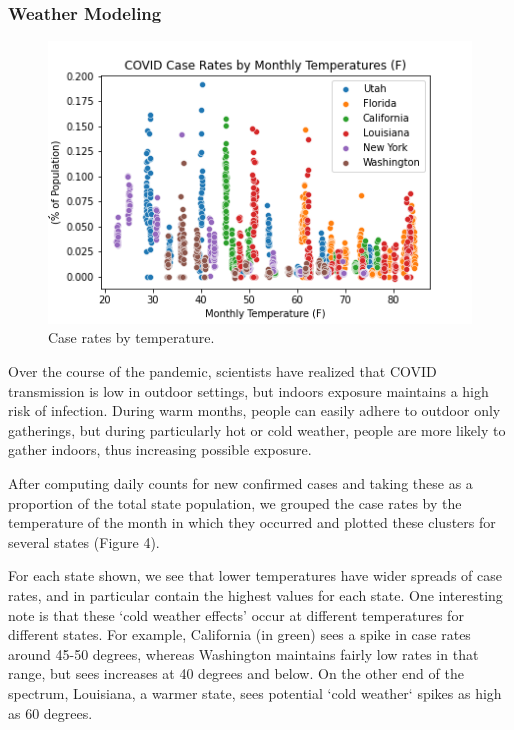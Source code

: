 \documentclass[11pt]{article}
\begin{document}
% 

\subsubsection{Weather Modeling}


\begin{figure}
\centering
\includegraphics[scale=0.45]{"../figures/case_rates_by_temp.png"}
\caption{Case rates by temperature.}
\end{figure}
Over the course of the pandemic, scientists have realized that COVID transmission is low in outdoor settings, but indoors exposure maintains a high risk of infection. During warm months, people can easily adhere to outdoor only gatherings, but during particularly hot or cold weather, people are more likely to gather indoors, thus increasing possible exposure. 

After computing daily counts for new confirmed cases and taking these as a proportion of the total state population, we grouped the case rates by the temperature of the month in which they occurred and plotted these clusters for several states (Figure 4).

For each state shown, we see that lower temperatures have wider spreads of case rates, and in particular contain the highest values for each state. One interesting note is that these `cold weather effects' occur at different temperatures for different states. For example, California (in green) sees a spike in case rates around 45-50 degrees, whereas Washington maintains fairly low rates in that range, but sees increases at 40 degrees and below. On the other end of the spectrum, Louisiana, a warmer state, sees potential `cold weather` spikes as high as 60 degrees. 
\end{document}
